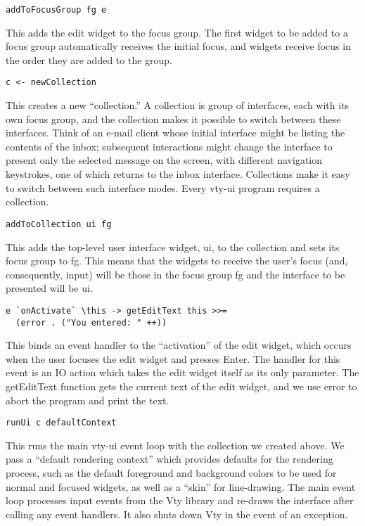 \documentclass[11pt, letterpaper, oneside, titlepage]{article}
\begin{document}
\begin{verbatim}
addToFocusGroup fg e
\end{verbatim}

This adds the edit widget to the focus group.  The first widget to be
added to a focus group automatically receives the initial focus, and
widgets receive focus in the order they are added to the group.

\begin{verbatim}
c <- newCollection
\end{verbatim}

This creates a new “collection.”  A collection is group of interfaces,
each with its own focus group, and the collection makes it possible to
switch between these interfaces.  Think of an e-mail client whose
initial interface might be listing the contents of the inbox; subsequent
interactions might change the interface to present only the selected
message on the screen, with different navigation keystrokes, one of
which returns to the inbox interface.  Collections make it easy to
switch between such interface modes.  Every vty-ui program requires a
collection.

\begin{verbatim}
addToCollection ui fg
\end{verbatim}

This adds the top-level user interface widget, ui, to the collection and
sets its focus group to fg.  This means that the widgets to receive the
user’s focus (and, consequently, input) will be those in the focus group
fg and the interface to be presented will be ui.

\begin{verbatim}
e `onActivate` \this -> getEditText this >>=
  (error . ("You entered: " ++))
\end{verbatim}

This binds an event handler to the “activation” of the edit widget,
which occurs when the user focuses the edit widget and presses Enter.
The handler for this event is an IO action which takes the edit widget
itself as its only parameter.  The getEditText function gets the current
text of the edit widget, and we use error to abort the program and print
the text.

\begin{verbatim}
runUi c defaultContext
\end{verbatim}

This runs the main vty-ui event loop with the collection we created
above.  We pass a “default rendering context” which provides defaults
for the rendering process, such as the default foreground and background
colors to be used for normal and focused widgets, as well as a “skin”
for line-drawing.  The main event loop processes input events from the
Vty library and re-draws the interface after calling any event handlers.
It also shuts down Vty in the event of an exception.
\end{document}
